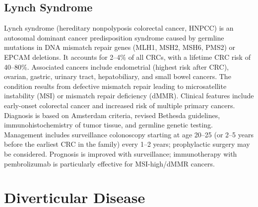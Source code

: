\subsection{Lynch Syndrome}
\label{sec:Lynch Syndrome}
Lynch syndrome (hereditary nonpolyposis colorectal cancer, HNPCC) is an autosomal dominant cancer predisposition syndrome caused by germline mutations in DNA mismatch repair genes (MLH1, MSH2, MSH6, PMS2) or EPCAM deletions. It accounts for 2--4\% of all CRCs, with a lifetime CRC risk of 40--80\%. Associated cancers include endometrial (highest risk after CRC), ovarian, gastric, urinary tract, hepatobiliary, and small bowel cancers. The condition results from defective mismatch repair leading to microsatellite instability (MSI) or mismatch repair deficiency (dMMR). Clinical features include early-onset colorectal cancer and increased risk of multiple primary cancers. Diagnosis is based on Amsterdam criteria, revised Bethesda guidelines, immunohistochemistry of tumor tissue, and germline genetic testing. Management includes surveillance colonoscopy starting at age 20--25 (or 2--5 years before the earliest CRC in the family) every 1--2 years; prophylactic surgery may be considered. Prognosis is improved with surveillance; immunotherapy with pembrolizumab is particularly effective for MSI-high/dMMR cancers.

\section{Diverticular Disease}








\label{sec:Diverticular Disease}


